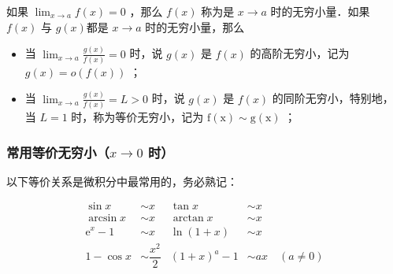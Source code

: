 \documentclass[fontset=fandol]{ctexart}
\newcommand{\ee}{\mathrm{e}}
\begin{document}
\begin{definition}[无穷小量]

	如果 $\lim _{x \rightarrow a} f(x)=0$ ，那么 $f(x)$ 称为是 $x \rightarrow a$ 时的无穷小量．如果 $f(x)$ 与 $g(x)$都是 $x \rightarrow a$ 时的无穷小量，那么

	\begin{itemize}

		\item[1．] 当 $\lim _{x \rightarrow a} \frac{g(x)}{f(x)}=0$ 时，说 $g(x)$ 是 $f(x)$ 的高阶无穷小，记为 $g(x)=o(f(x))$ ；

		\item[2．] 当 $\lim _{x \rightarrow a} \frac{g(x)}{f(x)}=L>0$ 时，说 $g(x)$ 是 $f(x)$ 的同阶无穷小，特别地，当 $L=1$ 时，称为等价无穷小，记为 $\mathrm{f}(\mathrm{x}) \sim \mathrm{g}(\mathrm{x})$ ；

	\end{itemize}



\end{definition}















\subsubsection{\texorpdfstring{常用等价无穷小（\(x \to 0\) 时）}{常用等价无穷小（x 趋于 0 时）}}



以下等价关系是微积分中最常用的，务必熟记：



\[

\boxed{

\begin{aligned}

\sin x &\sim x & \tan x &\sim x \\

\arcsin x &\sim x & \arctan x &\sim x \\

\ee^x - 1 &\sim x & \ln(1+x) &\sim x \\

1 - \cos x &\sim \dfrac{x^2}{2} & (1+x)^a - 1 &\sim ax \quad (a \neq 0)

\end{aligned}

}

\]
\end{document}
